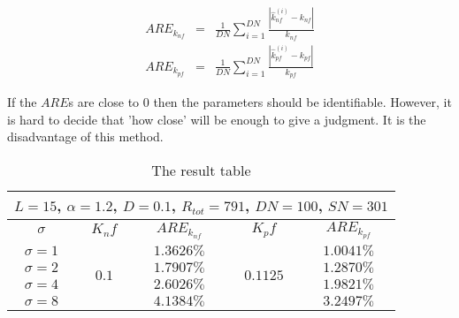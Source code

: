 \documentclass[12pt]{extarticle}
\begin{document}
\begin{equation*}
\begin{array}{rcl}
ARE_{k_{nf}} & = & \frac{1}{DN}\sum_{i=1}^{DN}\frac{\left|\hat{k}_{nf}^{(i)}-k_{nf}\right|}{k_{nf}} \\
ARE_{k_{pf}} & = & \frac{1}{DN}\sum_{i=1}^{DN}\frac{\left|\hat{k}_{pf}^{(i)}-k_{pf}\right|}{k_{pf}}
\end{array}
\end{equation*}

If the $ARE$s are close to 0 then the parameters should be identifiable. However, it is hard to decide that 'how close' will be enough to give a judgment. It is the disadvantage of this method. 

    
\begin{table}
\caption{The result table}
\begin{center}
\begin{tabular}{|c|c|c|c|c|}
\hline
\multicolumn{5}{|c|}{$L=15$, $\alpha=1.2$, $D=0.1$, $R_{tot}=791$, $DN=100$, $SN=301$} \\
\hline
$\sigma$ & $K_nf$ & $ARE_{k_{nf}}$ & $K_pf$ & $ARE_{k_{pf}}$ \\
\hline
$\sigma=1$ & \multirow{4}{*}{$0.1$} & $1.3626\%$ & \multirow{4}{*}{$0.1125$} & $1.0041\%$ \\
$\sigma=2$ &  & $1.7907\%$ &  & $1.2870\%$ \\
$\sigma=4$ &  & $2.6026\%$ &  & $1.9821\%$ \\
$\sigma=8$ &  & $4.1384\%$ &  & $3.2497\%$ \\
\hline
\end{tabular}
\end{center}
\end{table}
\end{document}
